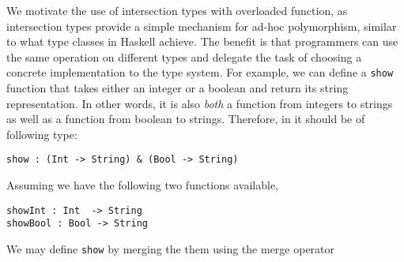 We motivate the use of intersection types with overloaded function, as
intersection types provide a simple mechanism for ad-hoc polymorphism, similar
to what type classes in Haskell achieve. The benefit is that programmers can use
the same operation on different types and delegate the task of choosing a
concrete implementation to the type system. For example, we can define a
\lstinline{show} function that takes either an integer or a boolean and return
its string representation. In other words, it is also \emph{both} a function
from integers to strings as well as a function from boolean to strings.
Therefore, in \name it should be of following type:
\begin{lstlisting}
show : (Int -> String) & (Bool -> String)
\end{lstlisting}
Assuming we have the following two functions available,
\begin{lstlisting}
showInt : Int  -> String 
showBool : Bool -> String
\end{lstlisting}
We may define \lstinline{show} by merging the them using the merge operator
